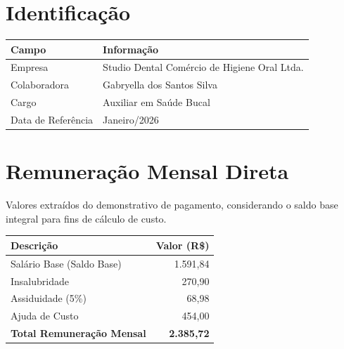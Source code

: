 \documentclass[12pt, a4paper]{article}
\begin{document}

\section{Identificação}

\begin{table}[H]
    \centering
    \renewcommand{\arraystretch}{1.5}
    \begin{tabularx}{\textwidth}{X X}
        \toprule
        \rowcolor{tableHeader} \textbf{Campo} & \textbf{Informação} \\
        \midrule
        Empresa & Studio Dental Comércio de Higiene Oral Ltda. \\
        \rowcolor{lightGray}
        Colaboradora & Gabryella dos Santos Silva \\
        Cargo & Auxiliar em Saúde Bucal \\
        \rowcolor{lightGray}
        Data de Referência & Janeiro/2026 \\
        \bottomrule
    \end{tabularx}
\end{table}

\section{Remuneração Mensal Direta}

Valores extraídos do demonstrativo de pagamento, considerando o saldo base integral para fins de cálculo de custo.

\begin{table}[H]
    \centering
    \renewcommand{\arraystretch}{1.5}
    \begin{tabularx}{\textwidth}{X r}
        \toprule
        \rowcolor{tableHeader} \textbf{Descrição} & \textbf{Valor (R\$)} \\
        \midrule
        Salário Base (Saldo Base) & 1.591,84 \\
        \rowcolor{lightGray}
        Insalubridade & 270,90 \\
        Assiduidade (5\%) & 68,98 \\
        \rowcolor{lightGray}
        Ajuda de Custo & 454,00 \\
        \midrule
        \rowcolor{accentColor!10} \textbf{Total Remuneração Mensal} & \textbf{2.385,72} \\
        \bottomrule
    \end{tabularx}
\end{table}
\end{document}
